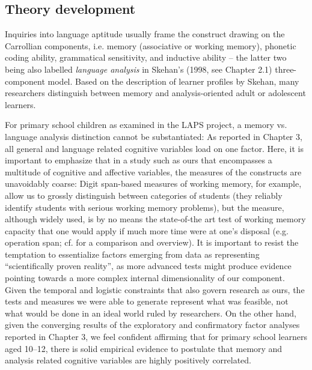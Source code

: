 \documentclass[output=paper]{langsci/langscibook}
\begin{document}
\subsection{Theory development}

Inquiries into language aptitude usually frame the construct drawing on the Carrollian components, i.e. memory (associative or working memory), phonetic coding ability, grammatical sensitivity, and inductive ability – the latter two being also labelled \textit{language analysis} in Skehan’s (1998, see Chapter 2.1) three-component model. Based on the description of learner profiles by Skehan, many researchers distinguish between memory and analysis-oriented adult or adolescent learners. 

For primary school children as examined in the LAPS project, a memory vs. language analysis distinction cannot be substantiated: As reported in Chapter 3, all general and language related cognitive variables load on one factor. Here, it is important to emphasize that in a study such as ours that encompasses a multitude of cognitive and affective variables, the measures of the constructs are unavoidably coarse: Digit span-based measures of working memory, for example, allow us to grossly distinguish between categories of students (they reliably identify students with serious working memory problems), but the measure, although widely used, is by no means the state-of-the art test of working memory capacity that one would apply if much more time were at one’s disposal (e.g. operation span; cf. \citealt{ConwayEtAl2005} for a comparison and overview). It is important to resist the temptation to essentialize factors emerging from data as representing ``scientifically proven reality'', as more advanced tests might produce evidence pointing towards a more complex internal dimensionality of our component. Given the temporal and logistic constraints that also govern research as ours, the tests and measures we were able to generate represent what was feasible, not what would be done in an ideal world ruled by researchers. On the other hand, given the converging results of the exploratory and confirmatory factor analyses reported in Chapter 3, we feel confident affirming that for primary school learners aged 10--12, there is solid empirical evidence to postulate that memory and analysis related cognitive variables are highly positively correlated.
\end{document}
